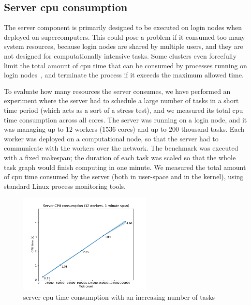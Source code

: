 \subsection{Server \acrshort{cpu} consumption}
\label{sec:hq-exp-server-cpu-consumption}
The \hyperqueue{} server component is primarily designed to be executed on login nodes
when deployed on supercomputers. This could pose a problem if it consumed too many system
resources, because login nodes are shared by multiple users, and they are not designed for
computationally intensive tasks. Some clusters even forcefully limit the total amount of
\gls{cpu} time that can be consumed by processes running on login
nodes~\cite{leonardo_time_limit}, and terminate the process if it exceeds the maximum allowed time.

To evaluate how many resources the server consumes, we have performed an experiment where the
server had to schedule a large number of tasks in a short time period (which acts as a sort of a
stress test), and we measured its total \gls{cpu} time consumption across all cores.
The server was running on a login node, and it was managing up to $12$ workers
($1536$ cores) and up to $200$ thousand tasks. Each worker was
deployed on a computational node, so that the server had to communicate with the workers over the
network. The benchmark was executed with a fixed makespan; the duration of each task was scaled so
that the whole task graph would finish computing in one minute. We measured the total amount of
\gls{cpu} time consumed by the server (both in user-space and in the kernel), using
standard Linux process monitoring tools.

\begin{figure}[h]
	\centering
	\includegraphics[width=0.6\textwidth]{imgs/hq/charts/server-utilization-tasks}
	\caption{\hyperqueue{} server \acrshort{cpu} time consumption with an increasing number of tasks}
	\label{fig:hq-server-cpu-consumption-tasks}
\end{figure}

